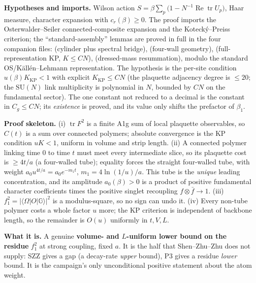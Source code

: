 \textbf{Hypotheses and imports.} Wilson action
$S=\beta\sum_p\bigl(1-N^{-1}\operatorname{Re}\operatorname{tr}U_p\bigr)$, Haar measure, character
expansion with $c_r(\beta)\ge0$. The proof imports the Osterwalder--Seiler connected-composite
expansion and the Koteck\'y--Preiss criterion; the ``standard-assembly'' lemmas are proved in
full in the four companion files:  (cylinder plus spectral bridge),
 (four-wall geometry), 
(full-representation KP, $K\le CN$),  (dressed-mass resummation), modulo
the standard OS/K\"all\'en--Lehmann representation. The hypothesis is the per-site condition
$u(\beta)K_{\mathrm{KP}}<1$ with explicit $K_{\mathrm{KP}}\le CN$ (the plaquette adjacency
degree is $\le20$; the $\mathrm{SU}(N)$ link multiplicity is polynomial in $N$, bounded by $CN$
on the fundamental sector). The one constant not reduced to a decimal is the constant in
$C_g\le CN$; its \emph{existence} is proved, and its value only shifts the prefactor of
$\beta_1$.

\textbf{Proof skeleton.} (i) $\operatorname{tr}F^2$ is a finite A1g sum of local plaquette
observables, so $C(t)$ is a sum over connected polymers; absolute convergence is the KP condition
$uK<1$, uniform in volume and strip length. (ii) A connected polymer linking time $0$ to time $t$
must meet every intermediate slice, so its plaquette cost is $\ge 4t/a$ (a four-walled tube);
equality forces the straight four-walled tube, with weight
$a_0u^{4t/a}=a_0e^{-m_1t}$, $m_1=4\ln(1/u)/a$. This tube is the \emph{unique} leading
concentration, and its amplitude $a_0(\beta)>0$ is a product of positive fundamental character
coefficients times the positive singlet recoupling $f\otimes\bar f\to1$. (iii)
$f_1^2=|\langle\Omega|O|\mathbb{G}\rangle|^2$ is a modulus-square, so no sign can undo it.
(iv) Every non-tube polymer costs a whole factor $u$ more; the KP criterion is independent of
backbone length, so the remainder is $O(u)$ uniformly in $t,V,L$.

\textbf{What it is.} A genuine \textbf{volume- and $L$-uniform lower bound on the residue}
$f_1^2$ at strong coupling, fixed $a$. It is the half that Shen--Zhu--Zhu does not supply: SZZ
gives a gap (a decay-rate \emph{upper} bound), P3 gives a residue \emph{lower} bound. It is the
campaign's only unconditional positive statement about the atom weight.

